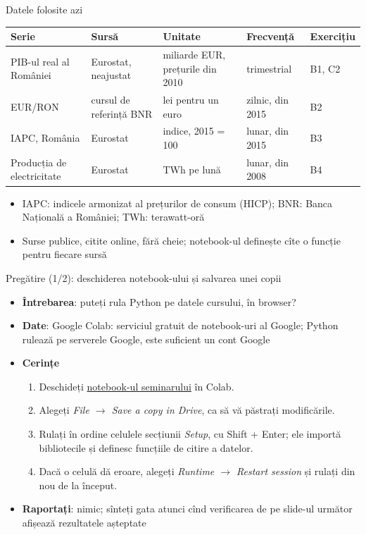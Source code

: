 \begin{frame}{Datele folosite azi}
\itemsize{\footnotesize}
\begin{center}
\footnotesize
\begin{tabular}{>{\raggedright\arraybackslash}p{2.8cm}>{\raggedright\arraybackslash}p{2.8cm}>{\raggedright\arraybackslash}p{2.9cm}>{\raggedright\arraybackslash}p{2.4cm}l}
\toprule
\textbf{Serie} & \textbf{Sursă} & \textbf{Unitate} & \textbf{Frecvență} & \textbf{Exercițiu} \\
\midrule
PIB-ul real al României & Eurostat, neajustat & miliarde EUR, prețurile din 2010 & trimestrial & B1, C2 \\
EUR/RON & cursul de referință BNR & lei pentru un euro & zilnic, din 2015 & B2 \\
IAPC, România & Eurostat & indice, 2015 = 100 & lunar, din 2015 & B3 \\
Producția de electricitate & Eurostat & TWh pe lună & lunar, din 2008 & B4 \\
\bottomrule
\end{tabular}
\end{center}
\begin{itemize}
    \item IAPC: indicele armonizat al prețurilor de consum (HICP); BNR: Banca Națională a României; TWh: terawatt-oră
    \item Surse publice, citite online, fără cheie; notebook-ul definește cîte o funcție pentru fiecare sursă
\end{itemize}
\end{frame}

\begin{frame}{Pregătire (1/2): deschiderea notebook-ului și salvarea unei copii}
\itemsize{\small}
\begin{itemize}
\item \textbf{Întrebarea}: puteți rula Python pe datele cursului, în browser?
\item \textbf{Date}: Google Colab: serviciul gratuit de notebook-uri al Google; Python rulează pe serverele Google, este suficient un cont Google
\item \textbf{Cerințe}
\begin{enumerate}
    \item Deschideți \href{\nb}{notebook-ul seminarului} în Colab.
    \item Alegeți \emph{File $\to$ Save a copy in Drive}, ca să vă păstrați modificările.
    \item Rulați în ordine celulele secțiunii \emph{Setup}, cu Shift + Enter; ele importă bibliotecile și definesc funcțiile de citire a datelor.
    \item Dacă o celulă dă eroare, alegeți \emph{Runtime $\to$ Restart session} și rulați din nou de la început.
\end{enumerate}
\item \textbf{Raportați}: nimic; sînteți gata atunci cînd verificarea de pe slide-ul următor afișează rezultatele așteptate
\end{itemize}
\end{frame}

